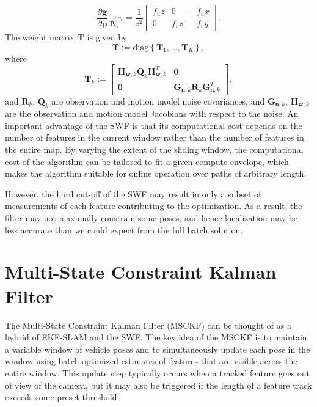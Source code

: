 \documentclass[letterpaper, 10 pt, conference]{ieeeconf}  %
\def\Vec#1{\mathbf{#1}}
\newcommand{\bbm}{\begin{bmatrix}}
\newcommand{\ebm}{\end{bmatrix}}
\newcommand{\pd}[2]{\frac{\partial #1}{\partial #2}}
\begin{document}
\begin{equation}
\pd{\Vec g}{ \Vec p}\Bigr|_{\bar{\Vec p}_{C_k}^{f_j C_k}} = \frac{1}{z^2} \bbm f_u z & 0 & - f_u x \\  0 & f_v z & -f_v y \ebm.
\end{equation}
The weight matrix $\Vec T$ is given by
\begin{equation}
\Vec{T} := \text{diag} \left\{ \Vec{T}_1,\hdots,\Vec{T}_K \right\},
\end{equation}
where
\begin{equation}
\Vec{T}_k := \bbm \Vec H_{\Vec w, k} \Vec Q_k \Vec H_{\Vec w, k}^T & \Vec 0 \\
\Vec 0 & \Vec G_{\Vec n, k} \Vec R_k \Vec G_{\Vec n, k}^T \ebm,
\end{equation}
and $\Vec R_k$, $\Vec Q_k$ are observation and motion model noise covariances, and $\Vec G_{\Vec n, k}$, $\Vec H_{\Vec w, k}$ are the observation and motion model Jacobians with respect to the noise. 
An important advantage of the SWF is that its computational cost depends on the number of features in the current window rather than the number of features in the entire map.
By varying the extent of the sliding window, the computational cost of the algorithm can be tailored to fit a given compute envelope, which makes the algorithm suitable for online operation over paths of arbitrary length.

However, the hard cut-off of the SWF may result in only a subset of measurements of each feature contributing to the optimization.
As a result, the filter may not maximally constrain some poses, and hence localization may be less accurate than we could expect from the full batch solution.

\section{Multi-State Constraint Kalman Filter} \label{sec:MSCKF}
The Multi-State Constraint Kalman Filter (MSCKF) \cite{Mourikis:2006:TechReport,Mourikis:2007:ICRA} can be thought of as a hybrid of EKF-SLAM and the SWF.
The key idea of the MSCKF is to maintain a variable window of vehicle poses and to simultaneously update each pose in the window using batch-optimized estimates of features that are visible across the entire window.
This update step typically occurs when a tracked feature goes out of view of the camera, but it may also be triggered if the length of a feature track exceeds some preset threshold.
\end{document}

